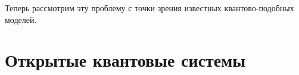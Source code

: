 Теперь рассмотрим эту проблему с точки зрения известных квантово-подобных моделей.
%

\section{Открытые квантовые системы}

